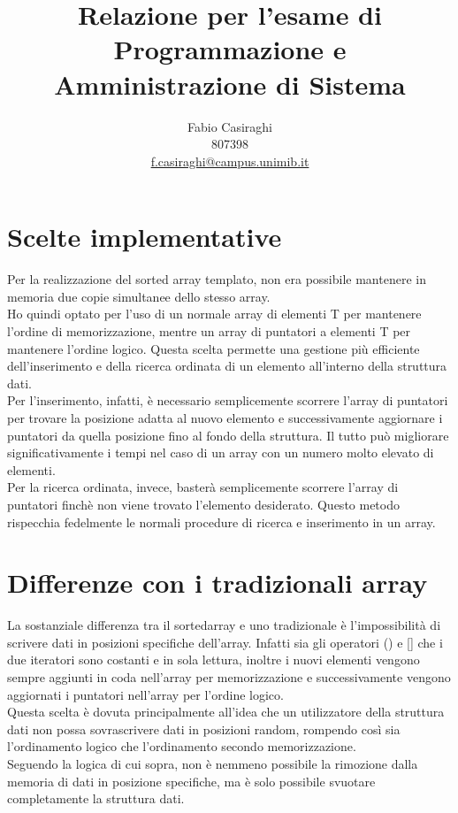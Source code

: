 \documentclass[11pt]{article}
\author{Fabio Casiraghi \\807398 \\ \href{mailto:f.casiraghi@campus.unimib.it} {f.casiraghi@campus.unimib.it}}
\title{Relazione per l'esame di Programmazione e Amministrazione di Sistema}
\begin{document}
\maketitle
\vspace{2cm}

\section*{Scelte implementative}
Per la realizzazione del sorted array templato, non era possibile mantenere in memoria
due copie simultanee dello stesso array. \\
Ho quindi optato per l'uso di un normale array di elementi T per mantenere l'ordine di memorizzazione,
mentre un array di puntatori a elementi T per mantenere l'ordine logico. Questa scelta permette
una gestione più efficiente dell'inserimento e della ricerca ordinata di un elemento all'interno della
struttura dati.\\
Per l'inserimento, infatti, è necessario semplicemente scorrere l'array di puntatori per trovare la 
posizione adatta al nuovo elemento e successivamente aggiornare i puntatori da quella posizione fino al fondo
della struttura. Il tutto può migliorare significativamente i tempi nel caso di un array 
con un numero molto elevato di elementi.\\
Per la ricerca ordinata, invece, basterà semplicemente scorrere l'array di puntatori finchè non viene 
trovato l'elemento desiderato. Questo metodo rispecchia fedelmente le normali procedure di ricerca e inserimento 
in un array.
\section*{Differenze con i tradizionali array}
La sostanziale differenza tra il sortedarray e uno tradizionale è l'impossibilità di scrivere dati in posizioni specifiche dell'array. Infatti sia gli operatori () e [] che i due iteratori sono costanti e in sola lettura, inoltre i nuovi elementi vengono sempre aggiunti in coda nell'array per memorizzazione e successivamente vengono aggiornati i puntatori nell'array per l'ordine logico.\\
Questa scelta è dovuta principalmente all'idea che un utilizzatore della struttura dati non possa sovrascrivere dati in posizioni random, rompendo così sia l'ordinamento logico che l'ordinamento secondo memorizzazione.\\
Seguendo la logica di cui sopra, non è nemmeno possibile la rimozione dalla memoria di dati in posizione specifiche, ma è solo possibile svuotare completamente la struttura dati.
\end{document}
